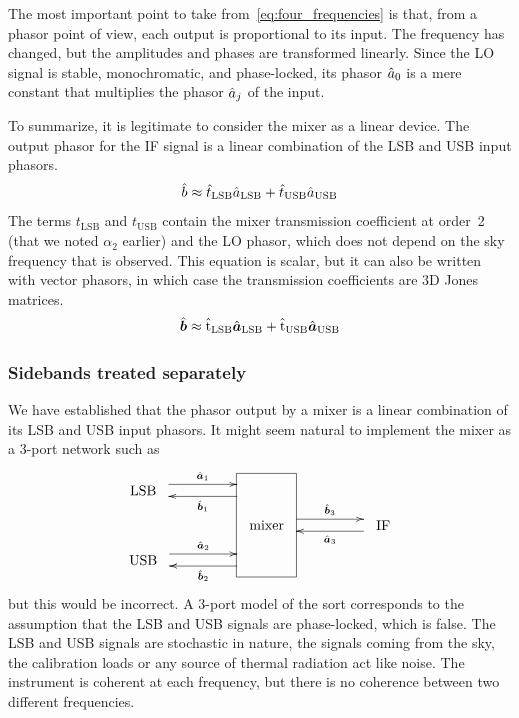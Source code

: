 The most important point to take from~\cref{eq:four_frequencies} is that, from a phasor point of view, each output is proportional to its input.
The frequency has changed, but the amplitudes and phases are transformed linearly.
Since the LO signal is stable, monochromatic, and phase-locked, its phasor $\hat{a}_0$ is a mere constant that multiplies the phasor $\hat{a}_j$ of the input.

To summarize, it is legitimate to consider the mixer as a linear device.
The output phasor for the IF signal is a linear combination of the LSB and USB input phasors.
\begin{equation}
    \hat{b} \approx \hat{t}_\text{LSB} \hat{a}_\text{LSB} + \hat{t}_\text{USB} \hat{a}_\text{USB}
\end{equation}
The terms $t_\text{LSB}$ and $t_\text{USB}$ contain the mixer transmission coefficient at order~2 (that we noted $\alpha_2$ earlier) and the LO phasor, which does not depend on the sky frequency that is observed.
This equation is scalar, but it can also be written with vector phasors, in which case the transmission coefficients are 3D Jones matrices.
\begin{equation}
    \hat{\bm{b}} \approx 
    \hat{\mathrm{t}}_\text{LSB} \hat{\bm{a}}_\text{LSB}
    +
    \hat{\mathrm{t}}_\text{USB} \hat{\bm{a}}_\text{USB}
\end{equation}

\subsubsection{Sidebands treated separately}
We have established that the phasor output by a mixer is a linear combination of its LSB and USB input phasors.
It might seem natural to implement the mixer as a 3-port network such as
\begin{equation*}
\xymatrix@R=0pt@C=48pt{
    *+++\txt{LSB}
    \ar@<1ex>[r]^-{\vectcp{a}_1}
    &
    *+++\txt{\phantom{mixer}}
    \ar@<1ex>[l]^-{\vectcp{b}_1}
    \\
    &
    *+++\txt{mixer}
    \ar@<1ex>[r]^-{\vectcp{b}_3}
    &
    *+++\txt{IF}
    \ar@<1ex>[l]^-{\vectcp{a}_3}
    \\
    *+++\txt{USB}
    \ar@<1ex>[r]^-{\vectcp{a}_2}
    &
    *+++\txt{\phantom{mixer}}
    \ar@<1ex>[l]^-{\vectcp{b}_2}
    \save "1,2"."3,2" *[F]\frm {}
    \restore
}
\end{equation*}
but this would be incorrect.
A 3-port model of the sort corresponds to the assumption that the LSB and USB signals are phase-locked, which is false.
The LSB and USB signals are stochastic in nature, the signals coming from the sky, the calibration loads or any source of thermal radiation act like noise.
The instrument is coherent at each frequency, but there is no coherence between two different frequencies.

